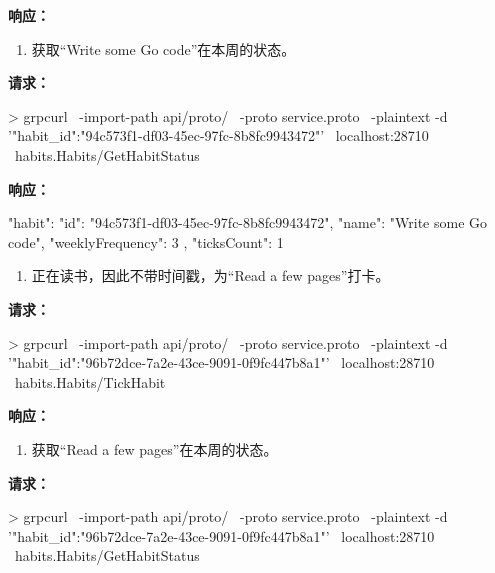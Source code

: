 \noindent\textbf{响应：}
\begin{shellcode}[]
{

}
\end{shellcode}

\begin{enumerate}[resume]
  \item 获取“Write some Go code”在本周的状态。
\end{enumerate}

\noindent\textbf{请求：}
\begin{shellcode}[]
> grpcurl \
-import-path api/proto/ \
-proto service.proto \
-plaintext -d '{"habit_id":"94c573f1-df03-45ec-97fc-8b8fc9943472"}' \
localhost:28710 \
habits.Habits/GetHabitStatus
\end{shellcode}

\noindent\textbf{响应：}
\begin{shellcode}[]
{
  "habit": {
    "id": "94c573f1-df03-45ec-97fc-8b8fc9943472",
    "name": "Write some Go code",
    "weeklyFrequency": 3
  },
  "ticksCount": 1
}
\end{shellcode}

\begin{enumerate}[resume]
  \item 正在读书，因此不带时间戳，为“Read a few pages”打卡。
\end{enumerate}

\noindent\textbf{请求：}
\begin{shellcode}[]
> grpcurl \
-import-path api/proto/ \
-proto service.proto \
-plaintext -d '{"habit_id":"96b72dce-7a2e-43ce-9091-0f9fc447b8a1"}' \
localhost:28710 \
habits.Habits/TickHabit
\end{shellcode}

\noindent\textbf{响应：}
\begin{shellcode}[]
{

}
\end{shellcode}

\begin{enumerate}[resume]
  \item 获取“Read a few pages”在本周的状态。
\end{enumerate}

\noindent\textbf{请求：}
\begin{shellcode}[]
> grpcurl \
-import-path api/proto/ \
-proto service.proto \
-plaintext -d '{"habit_id":"96b72dce-7a2e-43ce-9091-0f9fc447b8a1"}' \
localhost:28710 \
habits.Habits/GetHabitStatus
\end{shellcode}


